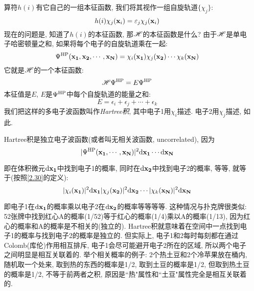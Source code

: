 算符$h(i)$有它自己的一组本征函数, 
我们将其视作一组自旋轨道$\{\chi_j\}$:
\begin{equation}
\label{2.29}
h(i)\chi_j(\mathbf{x}_i)=\varepsilon_j\chi_j(\mathbf{x}_i)
\end{equation}
现在的问题是, 
知道了$h(i)$的本征函数, 
那$\mathscr{H}$的本征函数是什么? 由于$\mathscr{H}$是单电子哈密顿量之和, 
如果将每个电子的自旋轨道乘在一起:
\begin{equation}
\label{2.30}
\Psi^{\rm HP}(\mathbf{x_1,x_2,\cdots,x_N})=\chi_i(\mathbf{x_1})\chi_j(\mathbf{x_2})\cdots\chi_k(\mathbf{x_N})
\end{equation}
它就是$\mathscr{H}$的一个本征函数:
\begin{equation}
\label{2.31}
\mathscr{H}\Psi^{\rm HP}=E\Psi^{\rm HP}
\end{equation}
本征值是$E$, 
$E$是$\Psi^{\rm HP}$中每个自旋轨道的能量之和:
\begin{equation}
\label{2.32}
E=\epsilon_i + \epsilon_j + \cdots + \epsilon_k
\end{equation} 
我们把这样的多电子波函数叫作\emph{Hartree积}, 
其中电子1用$\chi_i$描述. 
电子2用$\chi_j$描述, 
如此.



Hartree积是独立电子波函数(或者叫无相关波函数, uncorrelated), 因为
\begin{equation*}
|\Psi^{\rm HP}(\bo{x_1,\cdots,x_N})|^2\dd\bo{x_1}\cdots\dd\bo{x_N}
\end{equation*}

即在体积微元$\dd\bo{x_1}$中找到电子1的概率, 
同时在$\dd\bo{x_2}$中找到电子2的概率, 
等等, 
就等于(按照\ref{2.30}的定义):
\begin{equation*}
|\chi_i(\bo{x_1})|^2\dd\bo{x_1}|\chi_j(\bo{x_2})|^2\dd\bo{x_2}\cdots|\chi_k(\bo{x_N})|^2\dd\bo{x_N}
\end{equation*}

即电子1在$\dd\bo{x_1}$的概率乘以电子2在$\dd\bo{x_2}$的概率等等等等. 
这种情况与扑克牌很类似: 52张牌中找到红心A的概率(1/52)等于红心的概率(1/4)乘以A的概率(1/13), 
因为红心的概率和A的概率是不相关的(独立的). 
Hartree积就意味着在空间中一点找到电子1的概率与找到电子2的概率是独立的. 
但实际上, 
电子1和2每时每刻都在通过Colomb(库伦)作用相互排斥, 
电子1会尽可能避开电子2所在的区域, 
所以两个电子之间明显是相互关联着的. 
举个相关概率的例子: 2个热土豆和2个冷苹果放在桶内, 
随机取一个处来, 
取到热的东西的概率是1/2, 
取到土豆的概率是1/2, 
但取到热土豆的概率是1/2, 
不等于前两者之积, 
原因是``热"属性和``土豆"属性完全是相互关联着的.


